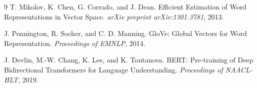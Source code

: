 \documentclass[UTF8,a4paper,10pt]{ctexart}
\begin{document}
\begin{thebibliography}{9}
  T. Mikolov, K. Chen, G. Corrado, and J. Dean.
  Efficient Estimation of Word Representations in Vector Space.
  \textit{arXiv preprint arXiv:1301.3781}, 2013.

  J. Pennington, R. Socher, and C. D. Manning.
  GloVe: Global Vectors for Word Representation.
  \textit{Proceedings of EMNLP}, 2014.

  J. Devlin, M.-W. Chang, K. Lee, and K. Toutanova.
  BERT: Pre-training of Deep Bidirectional Transformers for Language Understanding.
  \textit{Proceedings of NAACL-HLT}, 2019.
\end{thebibliography}
\end{document}
